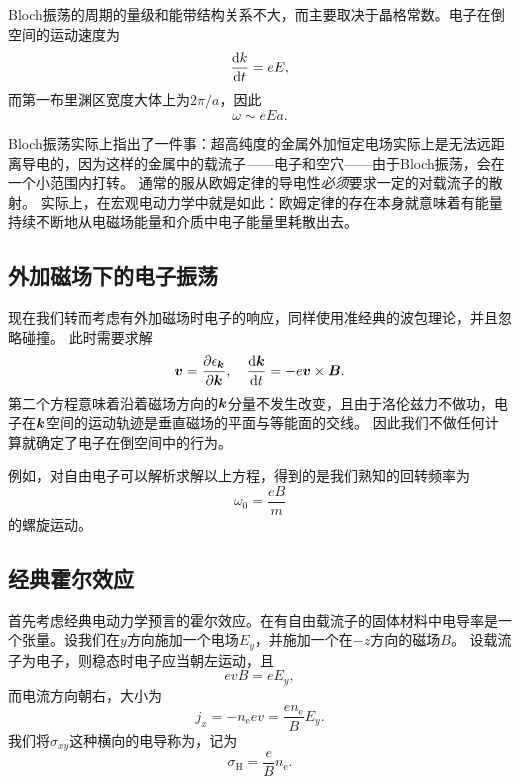 Bloch振荡的周期的量级和能带结构关系不大，而主要取决于晶格常数。电子在倒空间的运动速度为
\[
    \dv{k}{t} = e E,
\]
而第一布里渊区宽度大体上为$2 \pi / a$，因此
\begin{equation}
    \omega \sim e E a.
\end{equation}

Bloch振荡实际上指出了一件事：超高纯度的金属外加恒定电场实际上是无法远距离导电的，因为这样的金属中的载流子——电子和空穴——由于Bloch振荡，会在一个小范围内打转。
通常的服从欧姆定律的导电性\emph{必须}要求一定的对载流子的散射。
实际上，在宏观电动力学中就是如此：欧姆定律的存在本身就意味着有能量持续不断地从电磁场能量和介质中电子能量里耗散出去。

\subsection{外加磁场下的电子振荡}

现在我们转而考虑有外加磁场时电子的响应，同样使用准经典的波包理论，并且忽略碰撞。
此时需要求解
\begin{equation}
    \vb*{v} = \pdv{\epsilon_{\vb*{k}}}{\vb*{k}}, \quad \dv{\vb*{k}}{t} = -e \vb*{v} \times \vb*{B}.
    \label{eq:calssical-magnetic-field}
\end{equation}
第二个方程意味着沿着磁场方向的$\vb*{k}$分量不发生改变，且由于洛伦兹力不做功，电子在$\vb*{k}$空间的运动轨迹是垂直磁场的平面与等能面的交线。
因此我们不做任何计算就确定了电子在倒空间中的行为。

例如，对自由电子可以解析求解以上方程，得到的是我们熟知的回转频率为
\begin{equation}
    \omega_0 = \frac{e B}{m}
\end{equation}
的螺旋运动。

\subsection{经典霍尔效应}\label{sec:classical-hall-effect}

首先考虑经典电动力学预言的霍尔效应。在有自由载流子的固体材料中电导率是一个张量。设我们在$y$方向施加一个电场$E_y$，并施加一个在$-z$方向的磁场$B$。
设载流子为电子，则稳态时电子应当朝左运动，且
\[
    e v B = e E_y,
\]
而电流方向朝右，大小为
\[
    j_x = - n_\text{e} e v = \frac{e n_\text{e}}{B} E_y.
\]
我们将$\sigma_{xy}$这种横向的电导称为，记为
\begin{equation}
    \sigma_\text{H} = \frac{e}{B} n_\text{e}.
\end{equation}

